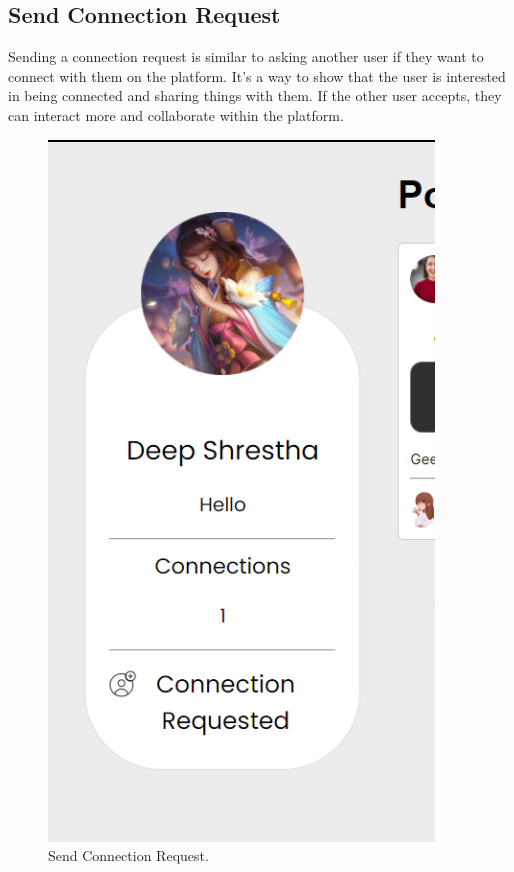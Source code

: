 \subsection{Send Connection Request}
Sending a connection request is similar to asking another user if they want to connect with them on the platform. It's a way to show that the user is interested in being connected and sharing things with them. If the other user accepts, they can interact more and collaborate within the platform.
\begin{figure}[H]
    \centering
    \includegraphics[height=0.3\textheight]{Outcome-ss/connection-request.png}
    \caption{Send Connection Request.}
    \label{fig:Send Connection Request}
\end{figure}

